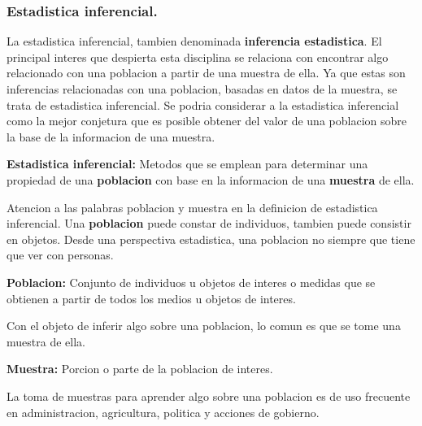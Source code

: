 \documentclass[]{article}
\begin{document}
\subsubsection*{Estadistica inferencial.}
La estadistica inferencial, tambien denominada \textbf{inferencia estadistica}. El principal interes que despierta esta disciplina se relaciona con encontrar algo relacionado con una poblacion a partir de una muestra de ella. Ya que estas son inferencias relacionadas con una poblacion, basadas en datos de la muestra, se trata de estadistica inferencial. Se podria considerar a la estadistica inferencial como la mejor conjetura que es posible obtener del valor de una poblacion sobre la base de la informacion de una muestra.
\begin{flushleft}
	\textbf{Estadistica inferencial: }Metodos que se emplean para determinar una propiedad de una \textbf{poblacion} con base en la informacion de una \textbf{muestra} de ella.
\end{flushleft}
Atencion a las palabras poblacion y muestra en la definicion de estadistica inferencial. Una \textbf{poblacion} puede constar de individuos, tambien puede consistir en objetos. Desde una perspectiva estadistica, una poblacion no siempre que tiene que ver con personas.

\begin{flushleft}
	\textbf{Poblacion: }Conjunto de individuos u objetos de interes o medidas que se obtienen a partir de todos los medios u objetos de interes.
\end{flushleft}
Con el objeto de inferir algo sobre una poblacion, lo comun es que se tome una muestra de ella.
\begin{flushleft}
	\textbf{Muestra: }Porcion o parte de la poblacion de interes.
\end{flushleft}
La toma de muestras para aprender algo sobre una poblacion es de uso frecuente en administracion, agricultura, politica y acciones de gobierno.
\end{document}
